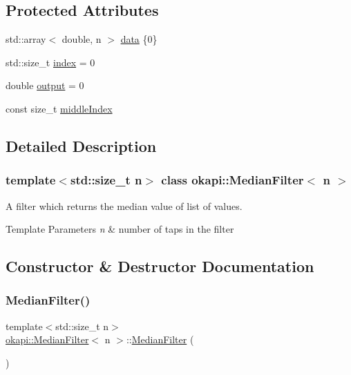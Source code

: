\subsection*{Protected Attributes}
\begin{DoxyCompactItemize}
\item 
std\+::array$<$ double, n $>$ \mbox{\hyperlink{classokapi_1_1MedianFilter_a9a6648a537ca4aac1095ee6de6e02806}{data}} \{0\}
\item 
std\+::size\+\_\+t \mbox{\hyperlink{classokapi_1_1MedianFilter_af5188b3df2e2f5cffed1b8b903ce1ef9}{index}} = 0
\item 
double \mbox{\hyperlink{classokapi_1_1MedianFilter_a1cd7af575ee6be29f36a6b920277ef21}{output}} = 0
\item 
const size\+\_\+t \mbox{\hyperlink{classokapi_1_1MedianFilter_a0730bda4e8ae740fc21ed98441d58fb2}{middle\+Index}}
\end{DoxyCompactItemize}


\subsection{Detailed Description}
\subsubsection*{template$<$std\+::size\+\_\+t n$>$\newline
class okapi\+::\+Median\+Filter$<$ n $>$}

A filter which returns the median value of list of values.


\begin{DoxyTemplParams}{Template Parameters}
{\em n} & number of taps in the filter \\
\hline
\end{DoxyTemplParams}


\subsection{Constructor \& Destructor Documentation}
\mbox{\label{classokapi_1_1MedianFilter_ab48a9a26745bf3ba81275c2857e63838}} 
\subsubsection{\texorpdfstring{MedianFilter()}{MedianFilter()}}
{\footnotesize\ttfamily template$<$std\+::size\+\_\+t n$>$ \\
\mbox{\hyperlink{classokapi_1_1MedianFilter}{okapi\+::\+Median\+Filter}}$<$ n $>$\+::\mbox{\hyperlink{classokapi_1_1MedianFilter}{Median\+Filter}} (\begin{DoxyParamCaption}{ }\end{DoxyParamCaption})\hspace{0.3cm}{\ttfamily [inline]}}



